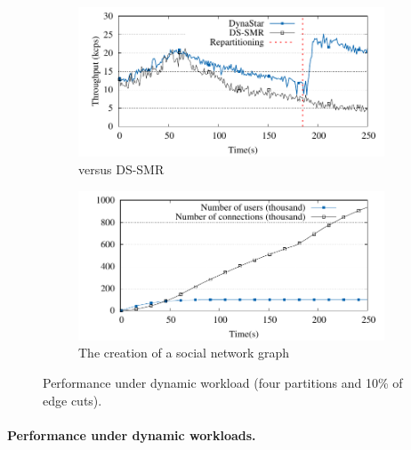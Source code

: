 \begin{figure}[h!]
  \centering
  \begin{subfigure}[b]{0.45\textwidth}
    \centering
    \includegraphics[width=0.95\columnwidth]{figures/experiments/social-network-dynamic/social-network-dynamic}
    \caption{\dynastar versus DS-SMR}
  \end{subfigure}
  \begin{subfigure}[b]{0.45\textwidth}
    \centering
    \includegraphics[width=0.95\columnwidth]{figures/experiments/social-network-dynamic/social-network-dynamic-structure}
    \caption{The creation of a social network graph}
  \end{subfigure}
    \caption{Performance under dynamic workload (four partitions and 10\% of edge cuts).}
	\label{fig:dynamic_load_tput}
\end{figure}


\paragraph*{Performance under dynamic workloads.}

